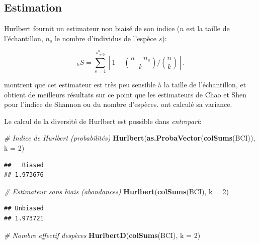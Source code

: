 \documentclass[
  11pt,
  french,
  a4paper,
  extrafontsizes,onecolumn,openright
  ]{memoir}
\newenvironment{Shaded}{\begin{snugshade}}{\end{snugshade}}
\newcommand{\AttributeTok}[1]{\textcolor[rgb]{0.13,0.29,0.53}{#1}}
\newcommand{\CommentTok}[1]{\textcolor[rgb]{0.56,0.35,0.01}{\textit{#1}}}
\newcommand{\DecValTok}[1]{\textcolor[rgb]{0.00,0.00,0.81}{#1}}
\newcommand{\FunctionTok}[1]{\textcolor[rgb]{0.13,0.29,0.53}{\textbf{#1}}}
\newcommand{\NormalTok}[1]{#1}
\begin{document}
\subsection{Estimation}\label{estimation-1}

Hurlbert fournit un estimateur non biaisé de son indice (\(n\) est la taille de l'échantillon, \(n_s\) le nombre d'individus de l'espèce \(s\)):

\begin{equation}
  \label{eq:EstHurlbert}
  _k{\tilde{S}}
  = \sum_{s=1}^{s^{n}_{\ne 0}}{\left[1-{\binom{n-n_s}{k}}/{\binom{n}{k}}\right]}.
\end{equation}

\textcite{Dauby2012} montrent que cet estimateur est très peu sensible à la taille de l'échantillon, et obtient de meilleurs résultats sur ce point que les estimateurs de Chao et Shen pour l'indice de Shannon ou du nombre d'espèces.
\textcite{Smith1977} ont calculé sa variance.

Le calcul de la diversité de Hurlbert est possible dans \emph{entropart}:

\scriptsize

\begin{Shaded}
\begin{Highlighting}[]
\CommentTok{\# Indice de Hurlbert (probabilités)}
\FunctionTok{Hurlbert}\NormalTok{(}\FunctionTok{as.ProbaVector}\NormalTok{(}\FunctionTok{colSums}\NormalTok{(BCI)), }\AttributeTok{k =} \DecValTok{2}\NormalTok{)}
\end{Highlighting}
\end{Shaded}

\begin{verbatim}
##   Biased 
## 1.973676
\end{verbatim}

\begin{Shaded}
\begin{Highlighting}[]
\CommentTok{\# Estimateur sans biais (abondances)}
\FunctionTok{Hurlbert}\NormalTok{(}\FunctionTok{colSums}\NormalTok{(BCI), }\AttributeTok{k =} \DecValTok{2}\NormalTok{)}
\end{Highlighting}
\end{Shaded}

\begin{verbatim}
## Unbiased 
## 1.973721
\end{verbatim}

\begin{Shaded}
\begin{Highlighting}[]
\CommentTok{\# Nombre effectif d\textquotesingle{}espèces}
\FunctionTok{HurlbertD}\NormalTok{(}\FunctionTok{colSums}\NormalTok{(BCI), }\AttributeTok{k =} \DecValTok{2}\NormalTok{)}
\end{Highlighting}
\end{Shaded}
\end{document}
